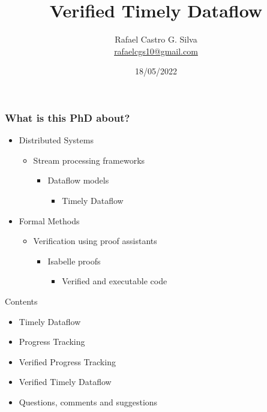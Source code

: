 \documentclass[aspectratio=169,10pt]{beamer}
\title[Verified Timely Dataflow]{Verified Timely Dataflow}
\author[Rafael Castro]{
  Rafael Castro G. Silva\\\medskip
  {\small \url{rafaelcgs10@gmail.com}}}
\date{18/05/2022}
\institute[UCPH]{
  Computer Science Department \\
  Copenhagen University}
\begin{document}
\begin{frame}
  \titlepage

\end{frame}

\begin{frame}[fragile]
  \frametitle{What is this PhD about?}
  \begin{itemize}
    \item Distributed Systems
          \begin{itemize}
            \item Stream processing frameworks
                  \begin{itemize}
                    \item Dataflow models
                          \begin{itemize}
                            \item Timely Dataflow
                          \end{itemize}
                  \end{itemize}
          \end{itemize}
    \item Formal Methods
          \begin{itemize}
            \item Verification using proof assistants
                  \begin{itemize}
                    \item Isabelle proofs
                          \begin{itemize}
                            \item Verified and executable code
                          \end{itemize}
                  \end{itemize}
          \end{itemize}
  \end{itemize}
\end{frame}

\begin{frame}{Contents}
  \begin{itemize}
    \item Timely Dataflow
    \item Progress Tracking
    \item Verified Progress Tracking
    \item Verified Timely Dataflow
    \item Questions, comments and suggestions
  \end{itemize}
\end{frame}
\end{document}
